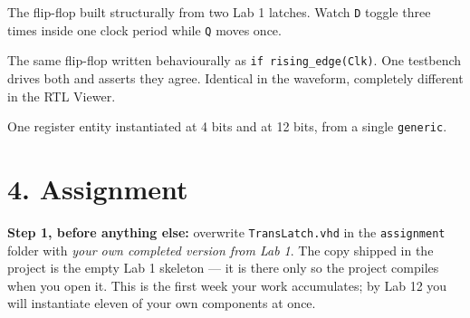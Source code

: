 \documentclass[11pt]{article}
\newcommand{\code}[1]{\texttt{#1}}
\begin{document}
\begin{description}[leftmargin=2.4em,style=nextline,itemsep=2pt]
\item[Example 1 --- \code{ms\_flipflop}] The flip-flop built structurally from
two Lab 1 latches. Watch \code{D} toggle three times inside one clock period
while \code{Q} moves once.
\item[Example 2 --- \code{dff}] The same flip-flop written behaviourally as
\code{if rising\_edge(Clk)}. One testbench drives both and asserts they agree.
Identical in the waveform, completely different in the RTL Viewer.
\item[Example 3 --- \code{reg\_n}] One register entity instantiated at 4 bits and
at 12 bits, from a single \code{generic}.
\end{description}

\section*{4. Assignment}

\textbf{Step 1, before anything else:} overwrite \code{TransLatch.vhd} in the
\code{assignment} folder with \emph{your own completed version from Lab 1}. The
copy shipped in the project is the empty Lab 1 skeleton --- it is there only so
the project compiles when you open it. This is the first week your work
accumulates; by Lab 12 you will instantiate eleven of your own components at once.
\end{document}
